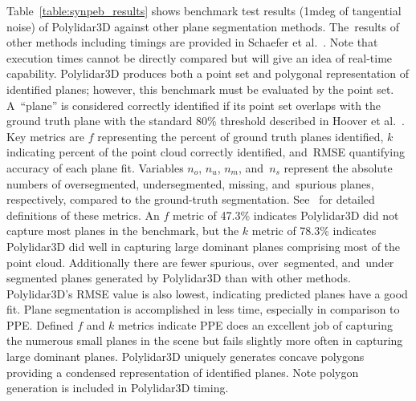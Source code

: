 Table~\ref{table:synpeb_results} shows benchmark test results (1mdeg of tangential noise) of Polylidar3D against other plane segmentation methods. The~results of other methods including timings are provided in Schaefer et al.~\cite{schaefer_maximum_2019}.  Note that execution times cannot be directly compared but will give an idea of real-time capability. Polylidar3D produces both a point set and polygonal representation of identified planes; however, this benchmark must be evaluated by the point set.   A~``plane'' is considered correctly identified if its point set overlaps with the ground truth plane with the standard 80\% threshold described in Hoover et al.~\cite{hoover_experimental_1996}. Key metrics are $f$ representing the percent of ground truth planes identified, $k$ indicating percent of the point cloud correctly identified, and~RMSE quantifying accuracy of each plane fit. Variables $n_o$, $n_u$, $n_m$, and~$n_s$ represent the absolute numbers of  oversegmented,  undersegmented,  missing,  and~spurious  planes, respectively,  compared  to  the  ground-truth  segmentation. See~\cite{schaefer_maximum_2019,hoover_experimental_1996} for detailed definitions of these metrics. %
An $f$ metric of 47.3\% indicates Polylidar3D did not capture most planes in the benchmark, but the $k$ metric of 78.3\% indicates Polylidar3D did well in capturing large dominant planes comprising most of the point cloud.  Additionally there are fewer spurious, over~segmented, and~under segmented planes generated by Polylidar3D than with other methods. Polylidar3D's RMSE value is also lowest, indicating predicted planes have a good fit. Plane segmentation is accomplished in less time, especially in comparison to PPE. Defined $f$ and $k$ metrics indicate PPE does an excellent job of capturing the numerous small planes in the scene but fails slightly more often in capturing large dominant planes.  Polylidar3D uniquely generates concave polygons providing a condensed representation of identified planes. Note polygon generation is included in Polylidar3D timing.





